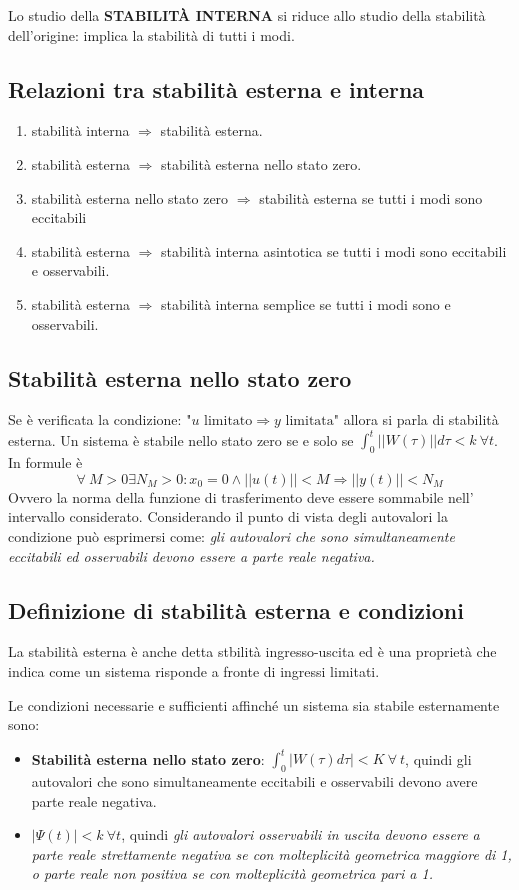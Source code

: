 \documentclass{article}
\begin{document}
Lo studio della \textbf{STABILITÀ INTERNA} si riduce allo studio della stabilità dell'origine: implica la stabilità di tutti i modi.


\subsection{Relazioni tra stabilità esterna e interna}
\begin{enumerate}
    \item stabilità interna $\Longrightarrow$ stabilità esterna.
    \item stabilità esterna $\Longrightarrow$ stabilità esterna nello stato zero.
    \item stabilità esterna nello stato zero $\Longrightarrow$ stabilità esterna se tutti i modi sono eccitabili
    \item stabilità esterna $\Longrightarrow$
    stabilità interna asintotica se tutti i modi sono eccitabili e osservabili.
    \item stabilità esterna $\Longrightarrow$ 
    stabilità interna semplice se tutti i modi sono e osservabili.
\end{enumerate}


\subsection{Stabilità esterna nello stato zero}
Se è verificata la condizione: "$u \text{ limitato} \Longrightarrow y \text{ limitata}$" allora si parla di stabilità esterna.
Un sistema è stabile nello stato zero se e solo se \(\displaystyle \int_{0}^{t}||W(\tau)||d\tau < k \ \forall t \).
In formule è
\[
    \forall\ M>0  \exists N_M>0 : x_0=0 \wedge  ||u(t)||<M\Longrightarrow||y(t)||<N_M
\]
Ovvero la norma della funzione di trasferimento deve essere sommabile nell' intervallo
considerato. Considerando il punto di vista degli autovalori la condizione può
esprimersi come: \textit{gli autovalori che sono simultaneamente eccitabili ed osservabili
devono essere a parte reale negativa.}


\subsection{Definizione di stabilità esterna e condizioni}
La stabilità esterna è anche detta stbilità ingresso-uscita
ed è una proprietà che indica come un sistema risponde
a fronte di ingressi limitati.

Le condizioni necessarie e sufficienti affinché un sistema sia stabile esternamente sono:
\begin{itemize}
\item  \textbf{Stabilità esterna nello stato zero}:
\(\displaystyle \int_{0}^{t} |W(\tau)d\tau|< K\ \forall\ t\),
quindi gli autovalori che sono simultaneamente eccitabili e osservabili
devono avere parte reale negativa.
\item $|\Psi(t)|<k\ \forall t$,
quindi \textit{gli autovalori osservabili in uscita devono essere a parte
reale strettamente negativa se con molteplicità geometrica maggiore di 1,
o parte reale non positiva se con molteplicità geometrica pari a 1.}
\end{itemize}
\end{document}
